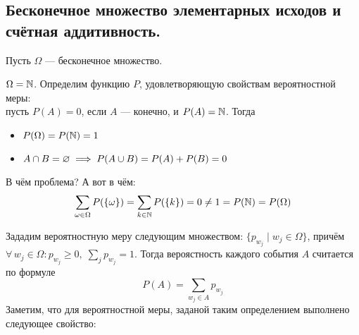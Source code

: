 \subsection{Бесконечное множество элементарных исходов и счётная аддитивность.}
Пусть $\Omega$ --- бесконечное множество.
\begin{example}
    $\Omega = \mathbb{N}$. Определим функцию $P$, удовлетворяющую свойствам вероятностной меры:\\
    пусть $P(A) = 0$, если $A$ --- конечно, и $P(A) = \mathbb{N}$. Тогда
    \begin{itemize}
        \item $P(\Omega) = P(\mathbb{N}) = 1$
        \item $A \cap B = \varnothing \implies P(A \cup B) = P(A) + P(B) = 0$
    \end{itemize}
    В чём проблема? А вот в чём:
    \[
        \sum\limits_{\omega \in \Omega} P(\{\omega\}) = \sum\limits_{k \in \mathbb{N}} P(\{k\}) = 0 \neq 1 = P(\mathbb{N}) = P(\Omega)
    \]
\end{example}
Зададим вероятностную меру следующим множеством: $\{p_{w_j}\;|\; w_j \in \Omega\}$, причём
$\forall\, w_j \in \Omega\colon p_{w_j} \geq 0,\; \sum\limits_{j} p_{w_j} = 1$. Тогда вероястность
каждого события $A$ считается по формуле
\[
    P(A) = \sum\limits_{w_j \in A} p_{w_j}
\]
Заметим, что для вероятностной меры, заданой таким определением выполнено следующее свойство:

